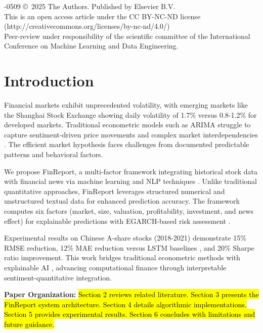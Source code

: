 \documentclass[3p,times,procedia]{elsarticle}
\begin{document}
\vspace{2pt}
-0509 \copyright\ 2025 The Authors. Published by Elsevier B.V.\\
This is an open access article under the CC BY-NC-ND license (http://creativecommons.org/licenses/by-nc-nd/4.0/)\\
Peer-review under responsibility of the scientific committee of the International Conference on Machine Learning and Data Engineering.

\vspace{3pt}

\section{Introduction}
\label{main}
\vspace{-3pt}
Financial markets exhibit unprecedented volatility, with emerging markets like the Shanghai Stock Exchange showing daily volatility of 1.7\% versus 0.8-1.2\% for developed markets. Traditional econometric models such as ARIMA \cite{Box1970} struggle to capture sentiment-driven price movements and complex market interdependencies \cite{FAMA1993}. The efficient market hypothesis faces challenges from documented predictable patterns and behavioral factors.

We propose FinReport, a multi-factor framework integrating historical stock data with financial news via machine learning and NLP techniques \cite{Bao2017}. Unlike traditional quantitative approaches, FinReport leverages structured numerical and unstructured textual data for enhanced prediction accuracy. The framework computes six factors (market, size, valuation, profitability, investment, and news effect) for explainable predictions with EGARCH-based risk assessment \cite{Nelson1991}.

Experimental results on Chinese A-share stocks (2018-2021) \cite{FinReportDataset2025} demonstrate 15\% RMSE reduction, 12\% MAE reduction versus LSTM baselines \cite{Fischer2018}, and 20\% Sharpe ratio improvement. This work bridges traditional econometric methods with explainable AI \cite{TETLOCK2007,Ribeiro2016}, advancing computational finance through interpretable sentiment-quantitative integration.

\vspace{1pt}
\noindent\textbf{Paper Organization:} \hl{Section 2 reviews related literature. Section 3 presents the FinReport system architecture. Section 4 details algorithmic implementations. Section 5 provides experimental results. Section 6 concludes with limitations and future guidance.}
\end{document}
